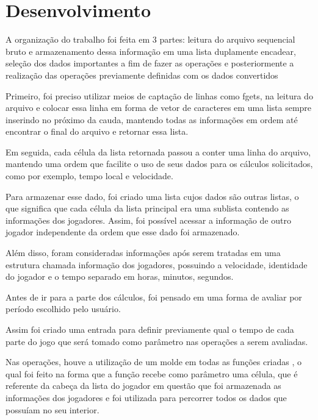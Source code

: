 \documentclass[conference]{IEEEtran}
\begin{document}
\section{Desenvolvimento}

A organização do trabalho foi feita em 3 partes: leitura do arquivo sequencial bruto e armazenamento dessa informação em uma lista duplamente encadear, seleção dos dados importantes a fim de fazer as operações e posteriormente a realização das operações previamente definidas com os dados convertidos

Primeiro, foi preciso utilizar meios de captação de linhas como fgets, na leitura do arquivo e colocar essa linha em forma de vetor de caracteres em uma lista sempre inserindo no próximo da cauda, mantendo todas as informações em ordem até encontrar o final do arquivo e retornar essa lista.

Em seguida, cada célula da lista retornada passou a conter uma linha do arquivo, mantendo uma ordem que facilite o uso de seus dados para os cálculos solicitados, como por exemplo, tempo local e velocidade. 

Para armazenar esse dado, foi criado uma lista cujos dados são outras listas, o que significa que cada célula da lista principal era uma sublista contendo as informações dos jogadores. Assim, foi possível acessar a informação de outro jogador independente da ordem que esse dado foi armazenado.

Além disso, foram consideradas informações após serem tratadas em uma estrutura chamada informação dos jogadores, possuindo a velocidade, identidade do jogador e  o tempo separado em horas, minutos, segundos.  

Antes de ir para a parte dos cálculos, foi pensado em uma forma de avaliar por período escolhido pelo usuário.

Assim foi criado uma entrada para definir previamente qual o tempo de cada parte do jogo que será tomado como parâmetro nas operações a serem avaliadas.

Nas operações, houve a utilização de um molde em todas as funções criadas , o qual foi feito na forma que a função recebe como parâmetro uma célula, que é referente da cabeça da lista do jogador em questão que foi armazenada as informações dos jogadores e foi utilizada para percorrer todos os dados que possuíam no seu interior. 
\end{document}
